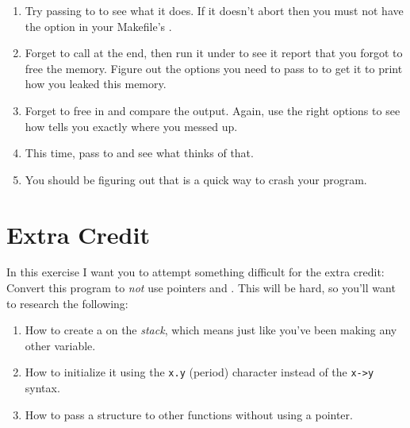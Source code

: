 \begin{enumerate}
\item Try passing  to  to see what
    it does.  If it doesn't abort then you must not have the
     option in your Makefile's .
\item Forget to call  at the end, then run
    it under  to see it report that you forgot
    to free the memory.  Figure out the options you need to pass
    to  to get it to print how you leaked
    this memory.
\item Forget to free  in 
    and compare the output.  Again, use the right options to 
    see how  tells you exactly where you messed
    up.
\item This time, pass  to  and
    see what  thinks of that.
\item You should be figuring out that  is a quick way
    to crash your program.
\end{enumerate}

\section{Extra Credit}

In this exercise I want you to attempt something difficult for
the extra credit:  Convert this program to \emph{not} use pointers
and .  This will be hard, so you'll want to research
the following:

\begin{enumerate}
\item How to create a  on the \emph{stack}, which
    means just like you've been making any other variable.
\item How to initialize it using the \verb|x.y| (period) character
    instead of the \verb|x->y| syntax.
\item How to pass a structure to other functions without using
    a pointer.
\end{enumerate}

